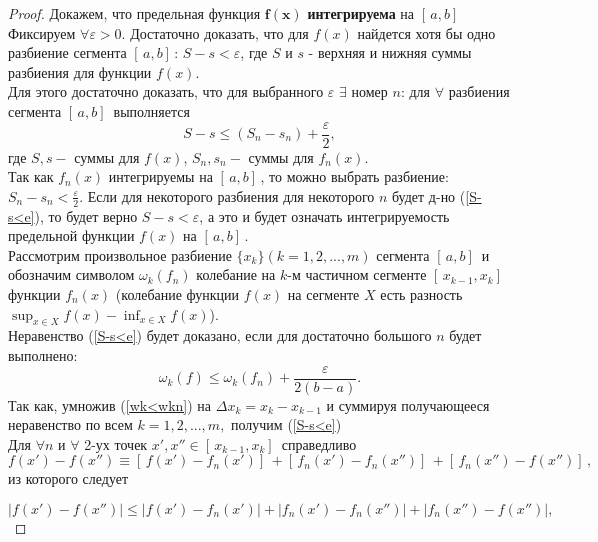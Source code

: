 \begin{proof}
Докажем, что предельная функция $\boldsymbol{f(x)}$ \textbf{интегрируема} на $[\,a,b]\,$ \\

Фиксируем $\forall \varepsilon > 0$. Достаточно доказать, что для $f(x)$ найдется хотя бы одно разбиение сегмента $[\,a,b]\,$: $S-s<\varepsilon$, где $S$ и $s$ - верхняя и нижняя суммы разбиения для функции $f(x)$. \\ 

Для этого достаточно доказать, что для выбранного $\varepsilon$ $\exists$ номер $n$: для $\forall$ разбиения сегмента $[\,a,b]\,$ выполняется
\begin{equation}\label{S-s<e}
    S-s \le (S_n - s_n) + \frac{\varepsilon}{2},
\end{equation}
где $S,s-$ суммы для $f(x)$, $S_n,s_n -$ суммы для $f_n(x)$. \\

Так как $f_n(x)$ интегрируемы на $[\,a,b]\,$, то можно выбрать разбиение: $S_n-s_n < \frac{\varepsilon}{2}$. Если для некоторого разбиения для некоторого $n$ будет д-но (\ref{S-s<e}), то будет верно $S -s < \varepsilon$, а это и будет означать интегрируемость предельной функции $f(x)$ на $[\,a,b]\,$. \\

Рассмотрим произвольное разбиение $\{x_k\} (k=1,2, ..., m)$ сегмента $[\,a,b]\,$ и обозначим символом $\omega_k(f_n) $ колебание на $k$-м частичном сегменте $[\,x_{k-1}, x_k]\,$ функции $f_n(x)$ (колебание функции $f(x)$ на сегменте $X$ есть разность $\sup_{x \in X}{f(x)} - \inf_{x \in X}{f(x)}$). \\

Неравенство (\ref{S-s<e}) будет доказано, если для достаточно большого $n$ будет выполнено:
\begin{equation}\label{wk<wkn}
    \omega_k(f) \le \omega_k(f_n) + \frac{\varepsilon}{2(b-a)}.
\end{equation}
Так как, умножив (\ref{wk<wkn}) на $\Delta x_k = x_k - x_{k-1}$ и суммируя получающееся неравенство по всем $k=1,2, ..., m,$ получим (\ref{S-s<e}) \\
Для $\forall n$ и $\forall$ 2-ух точек $x', x'' \in [\,x_{k-1}, x_k]\,$ справедливо $f(x') - f(x'') \equiv [\, f(x') - f_n(x')]\, +  [\, f_n(x') - f_n(x'')]\, +  [\, f_n(x'') - f(x'')]\,,$ из которого следует 

\begin{equation}\label{modules}
    |f(x') - f(x'')| \le |f(x') - f_n(x')| +  |f_n(x') - f_n(x'')| +  |f_n(x'') - f(x'')|,
\end{equation}


\end{proof}
